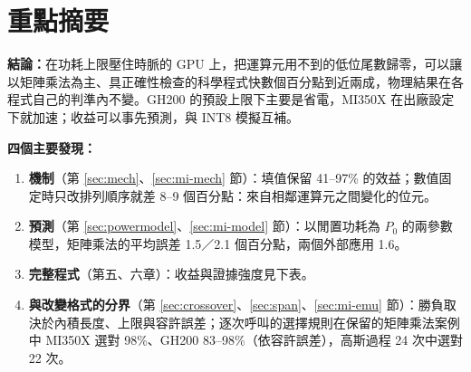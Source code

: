 \chapter*{重點摘要}

{\linespread{1.3}\selectfont
\noindent\textbf{結論：}在功耗上限壓住時脈的 GPU 上，把運算元用不到的低位尾數歸零，可以讓以矩陣乘法為主、具正確性檢查的科學程式快數個百分點到近兩成，物理結果在各程式自己的判準內不變。GH200 的預設上限下主要是省電，MI350X 在出廠設定下就加速；收益可以事先預測，與 INT8 模擬互補。

\vspace{0.4em}
\noindent\textbf{四個主要發現：}
\begin{enumerate}[itemsep=0.1em,topsep=0.2em]
  \item \textbf{機制}（第 \ref{sec:mech}、\ref{sec:mi-mech} 節）：填值保留 41–97\% 的效益；數值固定時只改排列順序就差 8–9 個百分點：來自相鄰運算元之間變化的位元。
  \item \textbf{預測}（第 \ref{sec:powermodel}、\ref{sec:mi-model} 節）：以閒置功耗為 $P_0$ 的兩參數模型，矩陣乘法的平均誤差 1.5／2.1 個百分點，兩個外部應用 1.6。
  \item \textbf{完整程式}（第五、六章）：收益與證據強度見下表。
  \item \textbf{與改變格式的分界}（第 \ref{sec:crossover}、\ref{sec:span}、\ref{sec:mi-emu} 節）：勝負取決於內積長度、上限與容許誤差；逐次呼叫的選擇規則在保留的矩陣乘法案例中 MI350X 選對 98\%、GH200 83–98\%（依容許誤差），高斯過程 24 次中選對 22 次。
\end{enumerate}
\par}

